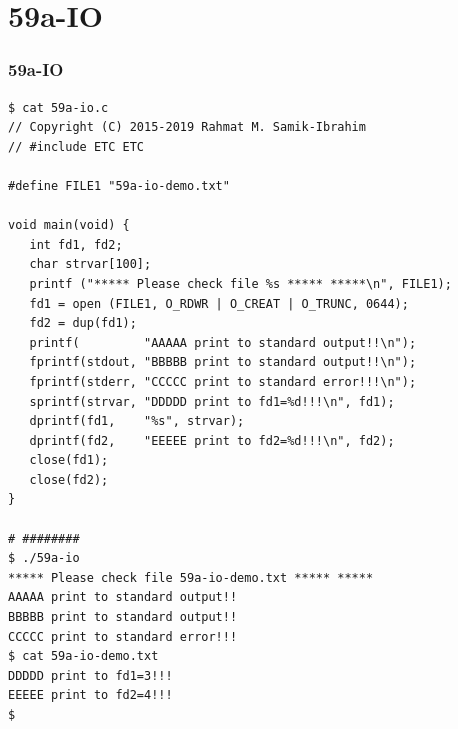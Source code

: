 \documentclass[xcolor=table, notheorems, hyperref={pdfpagelabels=false}]{beamer}
\begin{document}
\section{59a-IO}
\begin{frame}[fragile]
\frametitle{59a-IO}
\begin{lstlisting}[basicstyle=\ttfamily\tiny]
$ cat 59a-io.c 
// Copyright (C) 2015-2019 Rahmat M. Samik-Ibrahim
// #include ETC ETC

#define FILE1 "59a-io-demo.txt"

void main(void) {
   int fd1, fd2;
   char strvar[100];
   printf ("***** Please check file %s ***** *****\n", FILE1);
   fd1 = open (FILE1, O_RDWR | O_CREAT | O_TRUNC, 0644);
   fd2 = dup(fd1);
   printf(         "AAAAA print to standard output!!\n"); 
   fprintf(stdout, "BBBBB print to standard output!!\n"); 
   fprintf(stderr, "CCCCC print to standard error!!!\n");
   sprintf(strvar, "DDDDD print to fd1=%d!!!\n", fd1);
   dprintf(fd1,    "%s", strvar);
   dprintf(fd2,    "EEEEE print to fd2=%d!!!\n", fd2);
   close(fd1);
   close(fd2);
}

# ########
$ ./59a-io 
***** Please check file 59a-io-demo.txt ***** *****
AAAAA print to standard output!!
BBBBB print to standard output!!
CCCCC print to standard error!!!
$ cat 59a-io-demo.txt 
DDDDD print to fd1=3!!!
EEEEE print to fd2=4!!!
$ 

\end{lstlisting}
\end{frame}

\end{document}
